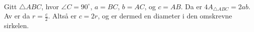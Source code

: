  \\
Gitt $ \triangle ABC$, hvor $ \angle C=90^\circ $, $ a=BC $, $ b=AC $, og $ c=AB $. Da er $ 4A_{\triangle ABC}=2ab $.
Av  er da $  r=\frac{c}{2} $. Altså er $ c=2r $, og er dermed en diameter i den omskrevne sirkelen.




